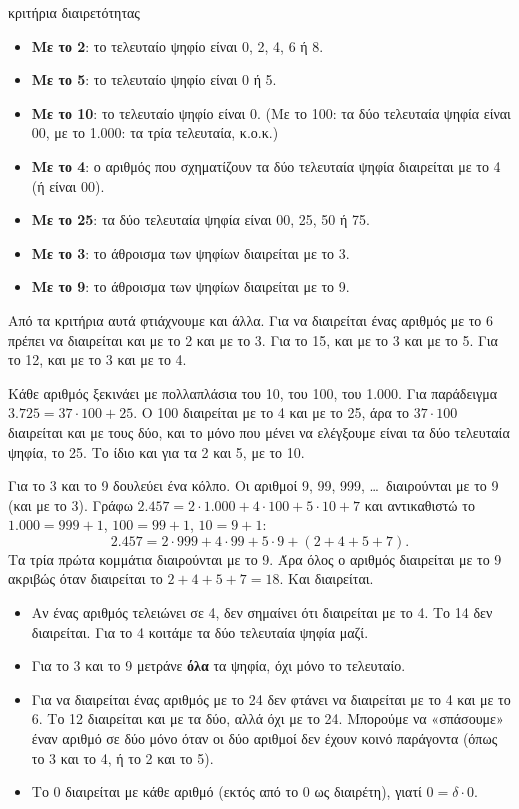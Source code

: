 
\begin{kanonas}{κριτήρια διαιρετότητας}
\begin{itemize}[leftmargin=1.2em,itemsep=0.3ex,topsep=2pt]
\item \textbf{Με το 2}: το τελευταίο ψηφίο είναι 0, 2, 4, 6 ή 8.
\item \textbf{Με το 5}: το τελευταίο ψηφίο είναι 0 ή 5.
\item \textbf{Με το 10}: το τελευταίο ψηφίο είναι 0. (Με το 100: τα δύο τελευταία ψηφία είναι 00, με το 1.000: τα τρία τελευταία, κ.ο.κ.)
\item \textbf{Με το 4}: ο αριθμός που σχηματίζουν τα δύο τελευταία ψηφία διαιρείται με το 4 (ή είναι 00).
\item \textbf{Με το 25}: τα δύο τελευταία ψηφία είναι 00, 25, 50 ή 75.
\item \textbf{Με το 3}: το άθροισμα των ψηφίων διαιρείται με το 3.
\item \textbf{Με το 9}: το άθροισμα των ψηφίων διαιρείται με το 9.
\end{itemize}
\end{kanonas}

Από τα κριτήρια αυτά φτιάχνουμε και άλλα. Για να διαιρείται ένας αριθμός με το 6 πρέπει να διαιρείται και με το 2 και με το 3. Για το 15, και με το 3 και με το 5. Για το 12, και με το 3 και με το 4.


Κάθε αριθμός ξεκινάει με πολλαπλάσια του 10, του 100, του 1.000. Για παράδειγμα $3.725=37\cdot 100+25$. Ο 100 διαιρείται με το 4 και με το 25, άρα το $37\cdot 100$ διαιρείται και με τους δύο, και το μόνο που μένει να ελέγξουμε είναι τα δύο τελευταία ψηφία, το 25. Το ίδιο και για τα 2 και 5, με το 10.

Για το 3 και το 9 δουλεύει ένα κόλπο. Οι αριθμοί 9, 99, 999, \dots\ διαιρούνται με το 9 (και με το 3). Γράφω $2.457=2\cdot 1.000+4\cdot 100+5\cdot 10+7$ και αντικαθιστώ το $1.000=999+1$, $100=99+1$, $10=9+1$:
$$2.457=2\cdot 999+4\cdot 99+5\cdot 9+(2+4+5+7).$$
Τα τρία πρώτα κομμάτια διαιρούνται με το 9. Άρα όλος ο αριθμός διαιρείται με το 9 ακριβώς όταν διαιρείται το $2+4+5+7=18$. Και διαιρείται.

\begin{prosoxi}
\begin{itemize}[leftmargin=1.2em,itemsep=0.3ex,topsep=2pt]
\item Αν ένας αριθμός τελειώνει σε 4, δεν σημαίνει ότι διαιρείται με το 4. Το 14 δεν διαιρείται. Για το 4 κοιτάμε τα δύο τελευταία ψηφία μαζί.
\item Για το 3 και το 9 μετράνε \textbf{όλα} τα ψηφία, όχι μόνο το τελευταίο.
\item Για να διαιρείται ένας αριθμός με το 24 δεν φτάνει να διαιρείται με το 4 και με το 6. Το 12 διαιρείται και με τα δύο, αλλά όχι με το 24. Μπορούμε να «σπάσουμε» έναν αριθμό σε δύο μόνο όταν οι δύο αριθμοί δεν έχουν κοινό παράγοντα (όπως το 3 και το 4, ή το 2 και το 5).
\item Το 0 διαιρείται με κάθε αριθμό (εκτός από το 0 ως διαιρέτη), γιατί $0=\delta\cdot 0$.
\end{itemize}
\end{prosoxi}

